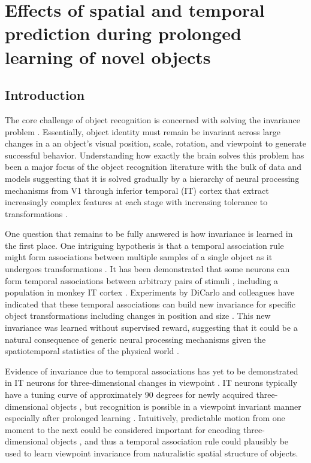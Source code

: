 \documentclass[dwyatte_dissertation.tex]{subfiles}
\begin{document}
\sloppy

\chapter{Effects of spatial and temporal prediction during prolonged learning of novel objects}
\label{chap:bpleast}

\section{Introduction}
The core challenge of object recognition is concerned with solving the invariance problem \cite{DicarloZoccolanRust12}. Essentially, object identity must remain be invariant across large changes in a an object's visual position, scale, rotation, and viewpoint to generate successful behavior. Understanding how exactly the brain solves this problem has been a major focus of the object recognition literature with the bulk of data and models suggesting that it is solved gradually by a hierarchy of neural processing mechanisms from V1 through inferior temporal (IT) cortex that extract increasingly complex features at each stage with increasing tolerance to transformations \cite{RiesenhuberPoggio99,SerreOlivaPoggio07,OReillyWyatteHerdEtAl13}.

One question that remains to be fully answered is how invariance is learned in the first place. One intriguing hypothesis is that a temporal association rule might form associations between multiple samples of a single object as it undergoes transformations \cite{StringerPerryRollsEtAl06,WallisBaddeley97,IsikLeiboPoggio12}. It has been demonstrated that some neurons can form temporal associations between arbitrary pairs of stimuli \cite{SakaiMiyashita91}, including a population in monkey IT cortex \cite{MeyerOlson11}. Experiments by DiCarlo and colleagues have indicated that these temporal associations can build new invariance for specific object transformations including changes in position and size \cite{CoxMeierOerteltEtAl05,LiDiCarlo08,LiDiCarlo10}. This new invariance was learned without supervised reward, suggesting that it could be a natural consequence of generic neural processing mechanisms given the spatiotemporal statistics of the physical world \cite{LiDiCarlo12}.

Evidence of invariance due to temporal associations has yet to be demonstrated in IT neurons for three-dimensional changes in viewpoint \cite[although see][for relevant human behavioral work]{WallisBulthoff01,WallisBackusLangerEtAl09}. IT neurons typically have a tuning curve of approximately 90 degrees for newly acquired three-dimensional objects \cite{LogothetisPaulsBulthoffEtAl94,LogothetisPaulsPoggio95}, but recognition is possible in a viewpoint invariant manner especially after prolonged learning \cite{WallisBulthoff99}. Intuitively, predictable motion from one moment to the next could be considered important for encoding three-dimensional objects \cite{LawsonHumphreysWatson94,Stone98,VuongTarr04,BalasSinha09b,BalasSinha09c,ChuangVuongBulthoff12}, and thus a temporal association rule could plausibly be used to learn viewpoint invariance from naturalistic spatial structure of objects.
\end{document}

